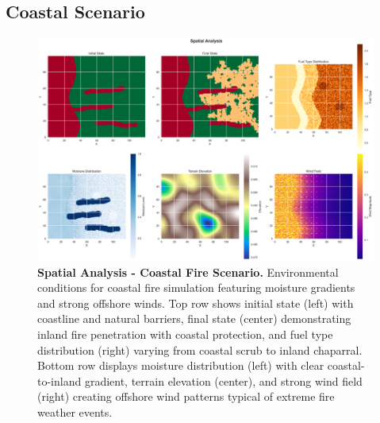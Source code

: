 \subsection{Coastal Scenario}
\begin{figure}[H]
	\centering
	\includegraphics[width=\textwidth]{media/spatial_analysis_coast.png}
	\caption{
		\textbf{Spatial Analysis - Coastal Fire Scenario.} 
		Environmental conditions for coastal fire simulation featuring moisture gradients and strong offshore winds. Top row shows initial state (left) with coastline and natural barriers, final state (center) demonstrating inland fire penetration with coastal protection, and fuel type distribution (right) varying from coastal scrub to inland chaparral. Bottom row displays moisture distribution (left) with clear coastal-to-inland gradient, terrain elevation (center), and strong wind field (right) creating offshore wind patterns typical of extreme fire weather events.
	}
	\label{fig:spatial_coast}
\end{figure}

